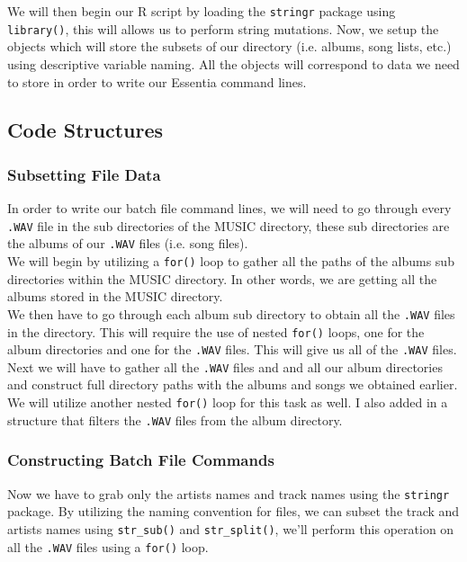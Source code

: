 \documentclass{article}\usepackage[]{graphicx}\usepackage[]{xcolor}
\begin{document}
\begin{multicols}{2}
We will then begin our R script by loading the \texttt{stringr} package using \texttt{library()}, this
will allows us to perform string mutations. Now, we setup the objects which will store the subsets of our
directory (i.e. albums, song lists, etc.) using descriptive variable naming. All the objects will correspond
to data we need to store in order to write our Essentia command lines.

\subsection{Code Structures}

\subsubsection{Subsetting File Data}
In order to write our batch file command lines, we will need to go through every \texttt{.WAV} file
in the sub directories of the MUSIC directory, these sub directories are the albums of our
\texttt{.WAV} files (i.e. song files). \\

We will begin by utilizing a \texttt{for()} loop to gather all the paths of the albums sub directories within the MUSIC directory. In other words, we are getting all the albums stored in the MUSIC directory. \\

We then have to go through each album sub directory to obtain all the \texttt{.WAV} files in the directory.
This will require the use of nested \texttt{for()} loops, one for the album directories and one for the
\texttt{.WAV} files. This will give us all of the \texttt{.WAV} files. \\

Next we will have to gather all the \texttt{.WAV} files and and all our album directories and construct full 
directory paths with the albums and songs we obtained earlier. We will utilize another nested \texttt{for()} 
loop for this task as well. I also added in a structure that filters the \texttt{.WAV} files from the album
directory.

\pagebreak

\subsubsection{Constructing Batch File Commands}
Now we have to grab only the artists names and track names using the \texttt{stringr} package. By utilizing
the naming convention for files, we can subset the track and artists names using \texttt{str}\verb|_|\texttt{sub()}
and \texttt{str}\verb|_|\texttt{split()}, we'll perform this operation on all the \texttt{.WAV} files using a \texttt{for()} loop. \\


\end{multicols}
\end{document}
